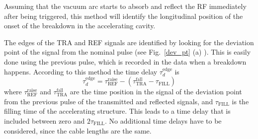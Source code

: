 Assuming that the vacuum arc starts to absorb and reflect the RF immediately after being triggered, this method will identify the longitudinal position of the onset of the breakdown in the accelerating cavity.

The edges of the TRA and REF signals are identified by looking for the deviation point of the signal from the nominal pulse (see Fig.~\ref{dev_pt} (a) ). This is easily done using the previous pulse, which is recorded in the data when a breakdown happens.  According to this method the time delay $\tau_d^{\text{edge}}$ is
\begin{equation}
\tau_d^{\text{edge}} = \tau_\text{REF} ^\text{raise} - (\tau_\text{TRA} ^\text{fall} - \tau_{\text{FILL}})
\end{equation}
where $\tau^\text{raise} _{\text{REF}} $ and $\tau^\text{fall} _{\text{TRA}}$ are the time position in the signal of the deviation point from the previous pulse of the transmitted and reflected signals, and $\tau_{\text{FILL}}$ is the filling time of the accelerating structure. This leads to a time delay that is included between zero and $2 \tau_{\text{FILL}}$. No additional time delays have to be considered, since the cable lengths are the same. 


